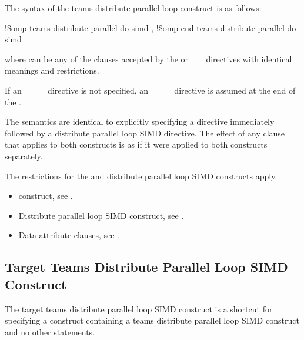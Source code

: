 {{{{\fortranspecificstart
The syntax of the teams distribute parallel loop construct is as follows:

\begin{boxedcode}
!\$omp teams distribute parallel do simd \plc{[clause[ [},\plc{] clause] ... ]}
\plc{[}!\$omp end teams distribute parallel do simd\plc{]}
\end{boxedcode}

where  can be any of the clauses accepted by the  or 
~~~
directives with identical meanings and restrictions.

If an ~~~~~ directive is not specified, an 
~~~~~ directive is assumed at the end of 
the .
\fortranspecificend

\descr
The semantics are identical to explicitly specifying a  directive immediately 
followed by a distribute parallel loop SIMD directive. The effect of any clause that 
applies to both constructs is as if it were applied to both constructs separately.

\restrictions
The restrictions for the  and distribute parallel loop
SIMD constructs apply.

\crossreferences
\begin{itemize}
\item {} construct, see 
.

\item Distribute parallel loop SIMD construct, see 
.

\item Data attribute clauses, see 
.
\end{itemize}










\subsection{Target Teams Distribute Parallel Loop SIMD Construct}
\label{subsec:Target Teams Distribute Parallel Loop SIMD Construct}
\summary
The target teams distribute parallel loop SIMD construct is a shortcut for specifying a  
construct containing a teams distribute parallel loop SIMD construct and no other statements.

}}}}
